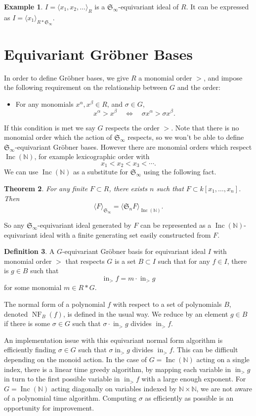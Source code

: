 \documentclass[10pt]{amsart}
\newtheorem{theorem}{Theorem}[section]
\theoremstyle{definition}
\newtheorem{definition}[theorem]{Definition}
\newtheorem{example}[theorem]{Example}
\theoremstyle{remark}
\numberwithin{equation}{section}
\newcommand{\B}[1]{\mathbb #1}
\newcommand{\F}[1]{\mathfrak #1}
\newcommand{\<}{\langle}
\renewcommand{\>}{\rangle}
\newcommand{\ideal}[1]{\langle #1 \rangle}
\newcommand{\LT}{\operatorname{in}_>}
\newcommand{\Inc}{\operatorname{Inc}(\B N)}
\newcommand{\NF}{\operatorname{NF}}
\begin{document}
\begin{example}
$I = \<x_1,x_2,\ldots\>_R$ is a $\F S_\infty$-equivariant ideal of $R$.  It can be expressed as $I= \<x_1\>_{R*\F S_\infty}$.
\end{example}

\section{Equivariant Gr\"obner Bases}
In order to define Gr\"obner bases, we give $R$ a monomial order $>$, and impose the following requirement on the relationship between $G$ and the order:
\begin{itemize}
 \item For any monomials $x^\alpha, x^\beta \in R$, and $\sigma \in G$,
\[ x^\alpha > x^\beta \quad \Leftrightarrow \quad \sigma x^\alpha > \sigma x^\beta. \]
\end{itemize}
If this condition is met we say $G$ respects the order $>$.
Note that there is no monomial order which the action of $\F S_\infty$ respects, so we won't be able to define $\F S_\infty$-equivariant Gr\"obner bases.  However there are monomial orders which respect $\Inc$, for example lexicographic order with
\[x_1 < x_2 < x_3 < \cdots.\]
We can use $\Inc$ as a substitute for $\F S_\infty$ using the following fact.
\begin{theorem}
For any finite $F \subset R$, there exists $n$ such that $F \subset k[x_1,\ldots,x_n]$.  Then
 \[ \ideal{F}_{\F S_\infty} = \ideal{\F S_n F}_{\Inc}. \]
\end{theorem}
So any $\F S_\infty$-equivariant ideal generated by $F$ can be represented as a $\Inc$-equivariant ideal with a finite generating set easily constructed from $F$.


\begin{definition}
 A $G$-equivariant Gr\"obner basis for equivariant ideal $I$ with monomial order $>$ that respects $G$ is a set $B \subset I$ such that for any $f \in I$, there is $g \in B$ such that
  \[ \LT f = m\cdot \LT g \]
 for some monomial $m \in R*G$.
\end{definition}

The normal form of a polynomial $f$ with respect to a set of polynomials $B$, denoted $\NF_B(f)$, is defined in the usual way.  We reduce by an element $g \in B$ if there is some $\sigma \in G$ such that $\sigma \cdot \LT g$ divides $\LT f$.

An implementation issue with this equivariant normal form algorithm is efficiently finding $\sigma \in G$ such that $\sigma \LT g$ divides $\LT f$.  This can be difficult depending on the monoid action.  In the case of $G = \Inc$ acting on a single index, there is a linear time greedy algorithm, by mapping each variable in $\LT g$ in turn to the first possible variable in $\LT f$ with a large enough exponent.  For $G = \Inc$ acting diagonally on variables indexed by $\B N \times \B N$, we are not aware of a polynomial time algorithm.  Computing $\sigma$ as efficiently as possible is an opportunity for improvement.
\end{document}
